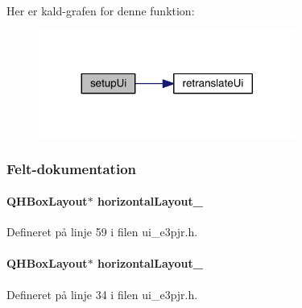 Her er kald-\/grafen for denne funktion\+:
\nopagebreak
\begin{figure}[H]
\begin{center}
\leavevmode
\includegraphics[width=239pt]{db/de3/class_ui___e3_p_j_r_acd00a207b203ce4e08e2d4fe020281d2_cgraph}
\end{center}
\end{figure}




\subsubsection{Felt-\/dokumentation}
\paragraph[{\texorpdfstring{horizontal\+Layout\+\_\+2}{horizontalLayout_2}}]{\setlength{\rightskip}{0pt plus 5cm}Q\+H\+Box\+Layout$\ast$ horizontal\+Layout\+\_}\hypertarget{class_ui___e3_p_j_r_a535a43287b7a5605cfc11580d146d3fb}{}\label{class_ui___e3_p_j_r_a535a43287b7a5605cfc11580d146d3fb}


Defineret på linje 59 i filen ui\+\_\+e3pjr.\+h.

\paragraph[{\texorpdfstring{horizontal\+Layout\+\_\+3}{horizontalLayout_3}}]{\setlength{\rightskip}{0pt plus 5cm}Q\+H\+Box\+Layout$\ast$ horizontal\+Layout\+\_}\hypertarget{class_ui___e3_p_j_r_af1b2167ad3027fe2c2328701164e54ec}{}\label{class_ui___e3_p_j_r_af1b2167ad3027fe2c2328701164e54ec}


Defineret på linje 34 i filen ui\+\_\+e3pjr.\+h.

